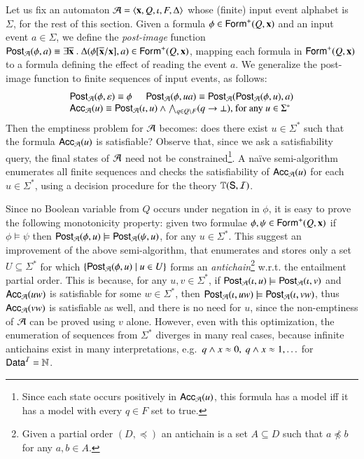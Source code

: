 \documentclass[10pt]{llncs}
\begin{document}
Let us fix an automaton $\mathcal{A} = \left\langle \mathbf x,Q,\iota,F,\Delta \right\rangle$ whose
(finite) input event alphabet is $\Sigma$, for the rest of this
section. Given a formula $\phi \in \mathsf{Form}^+(Q,\mathbf x)$ and an input
event $a \in \Sigma$, we define the \emph{post-image} function
$\mathsf{Post}_{\mathcal{A}}(\phi,a) \equiv \exists \overline{\mathbf x} ~.~
\Delta(\phi[\overline{\mathbf x}/\mathbf x], a) \in \mathsf{Form}^+(Q,\mathbf x)$,
mapping each formula in $\mathsf{Form}^+(Q,\mathbf x)$ to a formula defining the
effect of reading the event $a$. We generalize the post-image function
to finite sequences of input events, as follows:
\[\begin{array}{l}
\mathsf{Post}_{\mathcal{A}}(\phi,\varepsilon) \equiv \phi \hspace*{5mm} \mathsf{Post}_{\mathcal{A}}(\phi,ua) \equiv \mathsf{Post}_{\mathcal{A}}(\mathsf{Post}_{\mathcal{A}}(\phi,u),a) \\
\mathsf{Acc}_{\mathcal{A}}(u) \equiv \mathsf{Post}_{\mathcal{A}}(\iota,u) \wedge \bigwedge_{q \in Q \setminus F} (q \rightarrow \bot)\text{, for any $u \in \Sigma^*$}
\end{array}\]
Then the emptiness problem for $\mathcal{A}$ becomes: does there exist $u \in
\Sigma^*$ such that the formula $\mathsf{Acc}_{\mathcal{A}}(u)$ is satisfiable?
Observe that, since we ask a satisfiability query, the final states of
$\mathcal{A}$ need not be constrained\footnote{ Since each state occurs
  positively in $\mathsf{Acc}_{\mathcal{A}}(u)$, this formula has a model iff it has
  a model with every $q \in F$ set to true.}. A na\"ive semi-algorithm
enumerates all finite sequences and checks the satisfiability of
$\mathsf{Acc}_{\mathcal{A}}(u)$ for each $u \in \Sigma^*$, using a decision procedure
for the theory $\mathbb{T}(\mathsf{S},\mathcal{I})$.

Since no Boolean variable from $Q$ occurs under negation in $\phi$, it
is easy to prove the following monotonicity property: given two
formulae $\phi,\psi \in \mathsf{Form}^+(Q,\mathbf x)$ if $\phi \models \psi$
then $\mathsf{Post}_{\mathcal{A}}(\phi,u) \models \mathsf{Post}_{\mathcal{A}}(\psi,u)$, for any $u \in
\Sigma^*$. This suggest an improvement of the above semi-algorithm,
that enumerates and stores only a set $U \subseteq \Sigma^*$ for which
$\left\{ \mathsf{Post}_{\mathcal{A}}(\phi,u) \mid u \in U \right\}$ forms an
\emph{antichain}\footnote{Given a partial order $(D,\preceq)$ an
  antichain is a set $A \subseteq D$ such that $a \not\preceq b$ for
  any $a,b \in A$.} w.r.t. the entailment partial order. This is
because, for any $u,v \in \Sigma^*$, if $\mathsf{Post}_{\mathcal{A}}(\iota,u) \models
\mathsf{Post}_{\mathcal{A}}(\iota,v)$ and $\mathsf{Acc}_{\mathcal{A}}(uw)$ is satisfiable for some $w
\in \Sigma^*$, then $\mathsf{Post}_{\mathcal{A}}(\iota,uw) \models \mathsf{Post}_{\mathcal{A}}(\iota,vw)$,
thus $\mathsf{Acc}_{\mathcal{A}}(vw)$ is satisfiable as well, and there is no need
for $u$, since the non-emptiness of $\mathcal{A}$ can be proved using $v$
alone. However, even with this optimization, the enumeration of
sequences from $\Sigma^*$ diverges in many real cases, because
infinite antichains exist in many interpretations, e.g.\ $q \wedge x
\approx 0,~ q \wedge x \approx 1, \ldots$ for $\mathsf{Data}^{\mathcal{I}} = {\bf \mathbb{N}}$.
\end{document}
